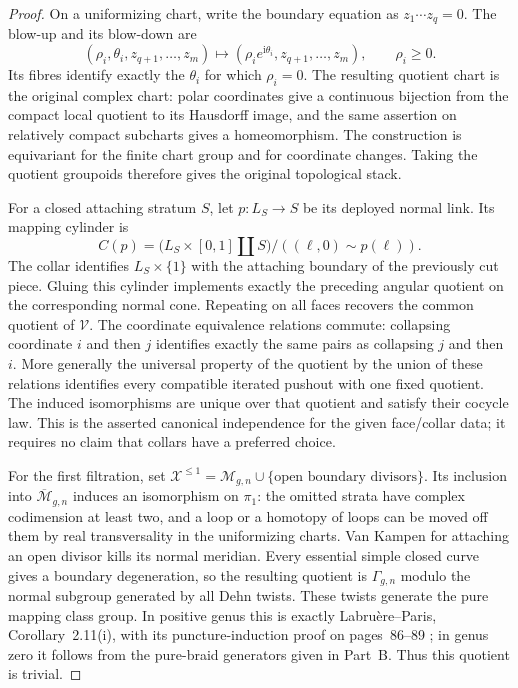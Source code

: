 \begin{proof}
On a uniformizing chart, write the boundary equation as $z_1\cdots z_q=0$. The blow-up and its blow-down are
\[
 (\rho_i,\theta_i,z_{q+1},\ldots,z_m)\longmapsto
 (\rho_i e^{\mathrm i\theta_i},z_{q+1},\ldots,z_m),\qquad \rho_i\geq0.
\]
Its fibres identify exactly the $\theta_i$ for which $\rho_i=0$. The resulting quotient chart is the original complex chart: polar coordinates give a continuous bijection from the compact local quotient to its Hausdorff image, and the same assertion on relatively compact subcharts gives a homeomorphism. The construction is equivariant for the finite chart group and for coordinate changes. Taking the quotient groupoids therefore gives the original topological stack.

For a closed attaching stratum $S$, let $p:L_S\to S$ be its deployed normal link. Its mapping cylinder is
\[
 C(p)=\bigl(L_S\times[0,1]\amalg S\bigr)/((\ell,0)\sim p(\ell)).
\]
The collar identifies $L_S\times\{1\}$ with the attaching boundary of the previously cut piece. Gluing this cylinder implements exactly the preceding angular quotient on the corresponding normal cone. Repeating on all faces recovers the common quotient of $\mathcal V$. The coordinate equivalence relations commute: collapsing coordinate $i$ and then $j$ identifies exactly the same pairs as collapsing $j$ and then $i$. More generally the universal property of the quotient by the union of these relations identifies every compatible iterated pushout with one fixed quotient. The induced isomorphisms are unique over that quotient and satisfy their cocycle law. This is the asserted canonical independence for the given face/collar data; it requires no claim that collars have a preferred choice.

For the first filtration, set $\mathcal X^{\leq1}=\mathcal M_{g,n}\cup\{\text{open boundary divisors}\}$. Its inclusion into $\overline{\mathcal M}_{g,n}$ induces an isomorphism on $\pi_1$: the omitted strata have complex codimension at least two, and a loop or a homotopy of loops can be moved off them by real transversality in the uniformizing charts. Van Kampen for attaching an open divisor kills its normal meridian. Every essential simple closed curve gives a boundary degeneration, so the resulting quotient is $\Gamma_{g,n}$ modulo the normal subgroup generated by all Dehn twists. These twists generate the pure mapping class group. In positive genus this is exactly Labru\`ere--Paris, Corollary~2.11(i), with its puncture-induction proof on pages~86--89 \cite{D_LabruereParis2001}; in genus zero it follows from the pure-braid generators given in Part~B. Thus this quotient is trivial.


\end{proof}

